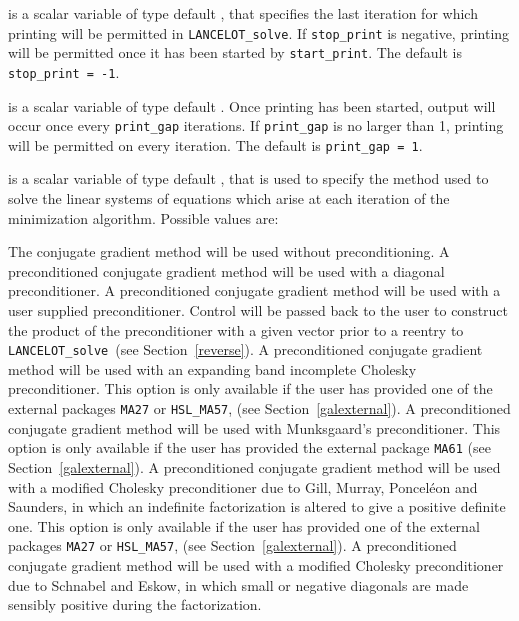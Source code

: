 \documentclass{galahad}
\newcommand{\fullpackagename}{LANC\-E\-LOT}
\newcommand{\solver}{{\tt \fullpackagename\_solve}}
\begin{document}
\begin{description}
 is a scalar variable of type default \integer, that specifies
the last iteration for which printing will be permitted in  \solver.
If {\tt stop\_print} is negative, printing will be permitted once it has been
started by {\tt start\_print}.
The default is {\tt stop\_print = -1}.

 is a scalar variable of type default \integer.
Once printing has been started, output will occur once every
{\tt print\_gap} iterations. If {\tt print\_gap} is no larger than 1,
printing will be permitted on every iteration.
The default is {\tt print\_gap = 1}.

 is a scalar variable of type default \integer, that
is used to specify the method used to solve the linear systems of equations
which arise at each iteration of the minimization algorithm.
 Possible values are:
\begin{description}
    The conjugate gradient method will be used without preconditioning.
    A preconditioned conjugate gradient
    method will be used with a diagonal
    preconditioner.
    A preconditioned conjugate gradient
    method will be used with a user supplied
    preconditioner. Control will be passed back to the user to
    construct the product of the preconditioner with a given
    vector prior to a reentry to \solver\
    (see Section~\ref{reverse}).
    A preconditioned conjugate gradient
    method will be used with an expanding band
    incomplete Cholesky preconditioner.
    This option is only available if the user has provided one of the
    external packages {\tt MA27} or {\tt HSL\_MA57},
    (see Section~\ref{galexternal}).
    A preconditioned conjugate gradient
    method will be used with Munksgaard's
    preconditioner.
    This option is only available if the user has provided the
    external package {\tt MA61}
    (see Section~\ref{galexternal}).
    A preconditioned conjugate gradient
    method will be used with a modified Cholesky
    preconditioner due to Gill, Murray, Poncel\'{e}on and Saunders,
    in which an indefinite factorization is altered to give a positive
    definite one.
    This option is only available if the user has provided one of the
    external packages {\tt MA27} or {\tt HSL\_MA57},
    (see Section~\ref{galexternal}).
    A preconditioned conjugate gradient
    method will be used with a modified Cholesky
    preconditioner due to Schnabel and Eskow,
    in which small or negative diagonals are
    made sensibly positive during the factorization.

\end{description}
\end{description}
\end{document}

